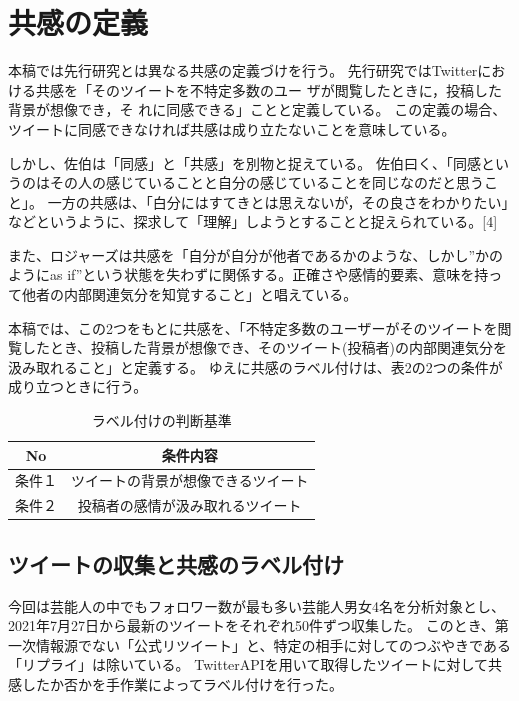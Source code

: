 \documentclass[dvipdfmx]{issj}
\begin{document}
\newpage

\section{共感の定義}  %
本稿では先行研究とは異なる共感の定義づけを行う。
先行研究ではTwitterにおける共感を「そのツイートを不特定多数のユー ザが閲覧したときに，投稿した背景が想像でき，そ れに同感できる」ことと定義している。
この定義の場合、ツイートに同感できなければ共感は成り立たないことを意味している。


しかし、佐伯は「同感」と「共感」を別物と捉えている。
佐伯曰く、「同感というのはその人の感じていることと自分の感じていることを同じなのだと思うこと」。
一方の共感は、「白分にはすてきとは思えないが，その良さをわかりたい」などというように、探求して「理解」しようとすることと捉えられている。[4]


また、ロジャーズは共感を「自分が自分が他者であるかのような、しかし”かのようにas if”という状態を失わずに関係する。正確さや感情的要素、意味を持って他者の内部関連気分を知覚すること」と唱えている。


本稿では、この2つをもとに共感を、「不特定多数のユーザーがそのツイートを閲覧したとき、投稿した背景が想像でき、そのツイート(投稿者)の内部関連気分を汲み取れること」と定義する。
ゆえに共感のラベル付けは、表2の2つの条件が成り立つときに行う。

\begin{table}[t]\centering
\caption{ラベル付けの判断基準}\label{tbl:font}
\begin{small}
\begin{tabular}{|c|c|} \hline
No   & 条件内容\\\hline\hline
条件１& ツイートの背景が想像できるツイート\\\hline
条件２ & 投稿者の感情が汲み取れるツイート\\\hline
\end{tabular}
\end{small}
\end{table}


\subsection{ツイートの収集と共感のラベル付け }  %
今回は芸能人の中でもフォロワー数が最も多い芸能人男女4名を分析対象とし、2021年7月27日から最新のツイートをそれぞれ50件ずつ収集した。
このとき、第一次情報源でない「公式リツイート」と、特定の相手に対してのつぶやきである「リプライ」は除いている。
TwitterAPIを用いて取得したツイートに対して共感したか否かを手作業によってラベル付けを行った。
\end{document}
